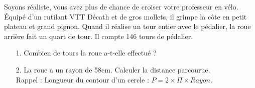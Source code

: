 Soyons réaliste, vous avez plus de chance de croiser votre professeur en vélo. Équipé d'un rutilant VTT Décath et de gros mollets, il grimpe la côte en petit plateau et grand pignon. Quand il réalise un tour entier avec le pédalier, la roue arrière fait un quart de tour. Il compte 146 tours de pédalier. 

\begin{enumerate}
  \item[1.] Combien de tours la roue a-t-elle effectué ?
  \item[2.] La roue a un rayon de 58cm. Calculer la distance parcourue. \\
    Rappel : Longueur du contour d'un cercle : $P = 2 \times \Pi \times Rayon$.   
\end{enumerate}


